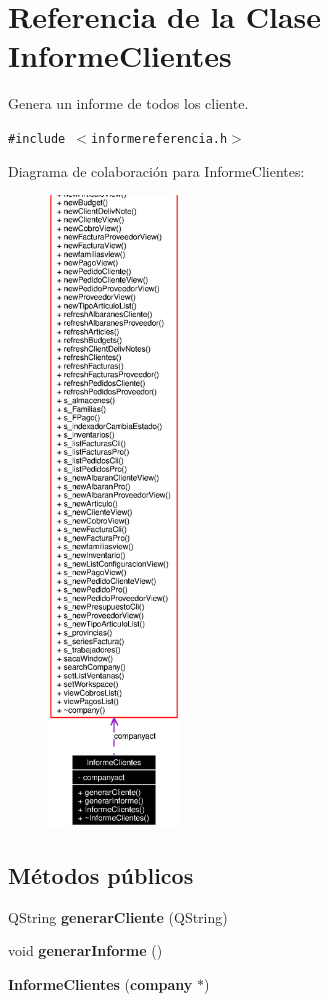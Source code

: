 \section{Referencia de la Clase Informe\-Clientes}
\label{classInformeClientes}
Genera un informe de todos los cliente.  


{\tt \#include $<$informereferencia.h$>$}

Diagrama de colaboraci\'{o}n para Informe\-Clientes:\begin{figure}[H]
\begin{center}
\leavevmode
\includegraphics[width=99pt]{classInformeClientes__coll__graph}
\end{center}
\end{figure}
\subsection*{M\'{e}todos p\'{u}blicos}
\begin{CompactItemize}
\item 
QString {\bf generar\-Cliente} (QString)
\item 
void {\bf generar\-Informe} ()
\item 
{\bf Informe\-Clientes} ({\bf company} $\ast$)
\end{CompactItemize}


